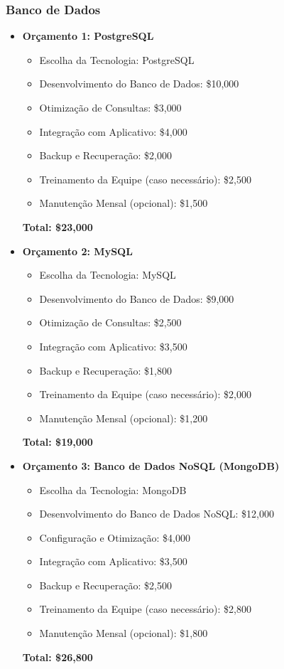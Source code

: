 	\subsubsection{Banco de Dados}
	\begin{itemize}
		\item \textbf{Orçamento 1: PostgreSQL}
		\begin{itemize}
			\item Escolha da Tecnologia: PostgreSQL
			\item Desenvolvimento do Banco de Dados: \$10,000
			\item Otimização de Consultas: \$3,000
			\item Integração com Aplicativo: \$4,000
			\item Backup e Recuperação: \$2,000
			\item Treinamento da Equipe (caso necessário): \$2,500
			\item Manutenção Mensal (opcional): \$1,500
		\end{itemize}
		
		\textbf{Total: \$23,000}
		
		\item \textbf{Orçamento 2: MySQL}
		\begin{itemize}
			\item Escolha da Tecnologia: MySQL
			\item Desenvolvimento do Banco de Dados: \$9,000
			\item Otimização de Consultas: \$2,500
			\item Integração com Aplicativo: \$3,500
			\item Backup e Recuperação: \$1,800
			\item Treinamento da Equipe (caso necessário): \$2,000
			\item Manutenção Mensal (opcional): \$1,200
		\end{itemize}
		
		\textbf{Total: \$19,000}
		
		\item \textbf{Orçamento 3: Banco de Dados NoSQL (MongoDB)}
		\begin{itemize}
			\item Escolha da Tecnologia: MongoDB
			\item Desenvolvimento do Banco de Dados NoSQL: \$12,000
			\item Configuração e Otimização: \$4,000
			\item Integração com Aplicativo: \$3,500
			\item Backup e Recuperação: \$2,500
			\item Treinamento da Equipe (caso necessário): \$2,800
			\item Manutenção Mensal (opcional): \$1,800
		\end{itemize}
		
		\textbf{Total: \$26,800}
	\end{itemize}
	
